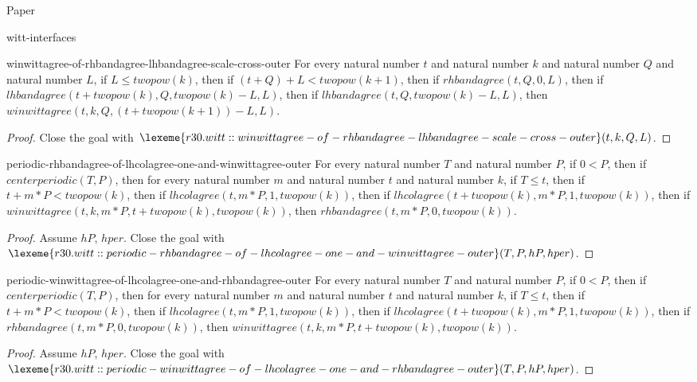 \begin{lexlean}{Paper}
\begin{section}{witt-interfaces}
  \begin{theorem}{winwittagree-of-rhbandagree-lhbandagree-scale-cross-outer}
  For every natural number \(t\) and natural number \(k\) and natural number \(Q\) and natural number \(L\), if \(L ≤ twopow(k)\), then if \((t + Q) + L < twopow(k + 1)\), then if \(rhbandagree(t, Q, 0, L)\), then if \(lhbandagree(t + twopow(k), Q, twopow(k) - L, L)\), then if \(lhbandagree(t, Q, twopow(k) - L, L)\), then \(winwittagree(t, k, Q, (t + twopow(k + 1)) - L, L)\).
  \begin{proof}
  Close the goal with \(\lexeme{r30.witt::winwittagree-of-rhbandagree-lhbandagree-scale-cross-outer}(t, k, Q, L)\).
  \end{proof}
  \end{theorem}

  \begin{theorem}{periodic-rhbandagree-of-lhcolagree-one-and-winwittagree-outer}
  For every natural number \(T\) and natural number \(P\), if \(0 < P\), then if \(centerperiodic(T, P)\), then for every natural number \(m\) and natural number \(t\) and natural number \(k\), if \(T ≤ t\), then if \(t + m * P < twopow(k)\), then if \(lhcolagree(t, m * P, 1, twopow(k))\), then if \(lhcolagree(t + twopow(k), m * P, 1, twopow(k))\), then if \(winwittagree(t, k, m * P, t + twopow(k), twopow(k))\), then \(rhbandagree(t, m * P, 0, twopow(k))\).
  \begin{proof}
  Assume \(hP\), \(hper\).
  Close the goal with \(\lexeme{r30.witt::periodic-rhbandagree-of-lhcolagree-one-and-winwittagree-outer}(T, P, hP, hper)\).
  \end{proof}
  \end{theorem}

  \begin{theorem}{periodic-winwittagree-of-lhcolagree-one-and-rhbandagree-outer}
  For every natural number \(T\) and natural number \(P\), if \(0 < P\), then if \(centerperiodic(T, P)\), then for every natural number \(m\) and natural number \(t\) and natural number \(k\), if \(T ≤ t\), then if \(t + m * P < twopow(k)\), then if \(lhcolagree(t, m * P, 1, twopow(k))\), then if \(lhcolagree(t + twopow(k), m * P, 1, twopow(k))\), then if \(rhbandagree(t, m * P, 0, twopow(k))\), then \(winwittagree(t, k, m * P, t + twopow(k), twopow(k))\).
  \begin{proof}
  Assume \(hP\), \(hper\).
  Close the goal with \(\lexeme{r30.witt::periodic-winwittagree-of-lhcolagree-one-and-rhbandagree-outer}(T, P, hP, hper)\).
  \end{proof}
  \end{theorem}


\end{section}
\end{lexlean}
